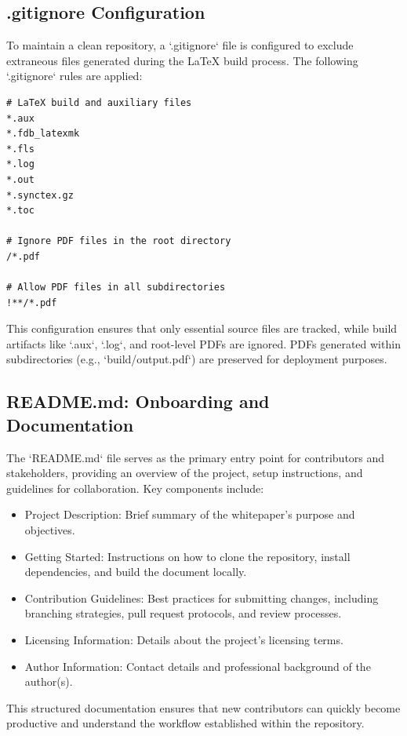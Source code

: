 \documentclass[11pt]{article}
\begin{document}
	\subsection{.gitignore Configuration}

	To maintain a clean repository, a `.gitignore` file is configured to exclude extraneous files generated during the LaTeX build process. The following `.gitignore` rules are applied:

	\begin{lstlisting}[language=gitignore]
# LaTeX build and auxiliary files
*.aux
*.fdb_latexmk
*.fls
*.log
*.out
*.synctex.gz
*.toc

# Ignore PDF files in the root directory
/*.pdf

# Allow PDF files in all subdirectories
!**/*.pdf
	\end{lstlisting}

	This configuration ensures that only essential source files are tracked, while build artifacts like `.aux`, `.log`, and root-level PDFs are ignored. PDFs generated within subdirectories (e.g., `build/output.pdf`) are preserved for deployment purposes.

	\subsection{README.md: Onboarding and Documentation}

	The `README.md` file serves as the primary entry point for contributors and stakeholders, providing an overview of the project, setup instructions, and guidelines for collaboration. Key components include:

	\begin{itemize}
		\item Project Description: Brief summary of the whitepaper's purpose and objectives.
		\item Getting Started: Instructions on how to clone the repository, install dependencies, and build the document locally.
		\item Contribution Guidelines: Best practices for submitting changes, including branching strategies, pull request protocols, and review processes.
		\item Licensing Information: Details about the project's licensing terms.
		\item Author Information: Contact details and professional background of the author(s).
	\end{itemize}

	This structured documentation ensures that new contributors can quickly become productive and understand the workflow established within the repository.
\end{document}
